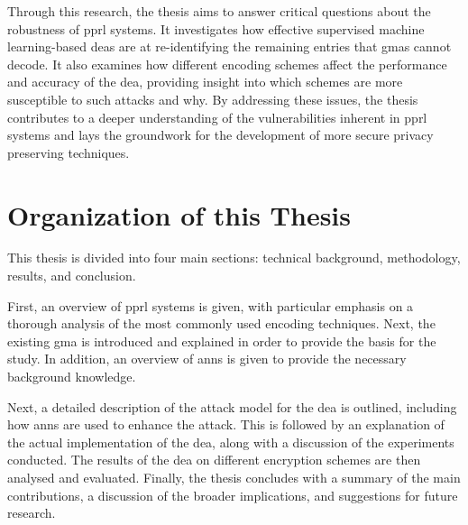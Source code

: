 Through this research, the thesis aims to answer critical questions about the robustness of \ac{pprl} systems. 
It investigates how effective supervised machine learning-based \ac{dea}s are at re-identifying the remaining entries that \ac{gma}s cannot decode.
It also examines how different encoding schemes affect the performance and accuracy of the \ac{dea}, providing insight into which schemes are more susceptible to such attacks and why. 
By addressing these issues, the thesis contributes to a deeper understanding of the vulnerabilities inherent in \ac{pprl} systems and lays the groundwork for the development of more secure privacy preserving techniques.

\section{Organization of this Thesis}  \label{sec:orga}

This thesis is divided into four main sections: technical background, methodology, results, and conclusion.

First, an overview of \ac{pprl} systems is given, with particular emphasis on a thorough analysis of the most commonly used encoding techniques.
Next, the existing \ac{gma} is introduced and explained in order to provide the basis for the study.
In addition, an overview of \ac{ann}s is given to provide the necessary background knowledge.

Next, a detailed description of the attack model for the \ac{dea} is outlined, including how \ac{ann}s are used to enhance the attack.
This is followed by an explanation of the actual implementation of the \ac{dea}, along with a discussion of the experiments conducted.
The results of the \ac{dea} on different encryption schemes are then analysed and evaluated.
Finally, the thesis concludes with a summary of the main contributions, a discussion of the broader implications, and suggestions for future research.